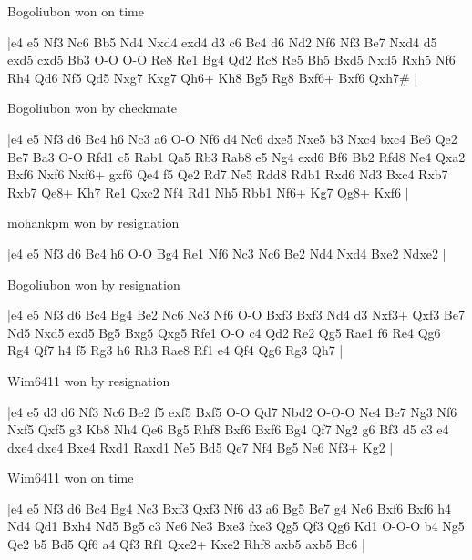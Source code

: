 \showboard

Bogoliubon won on time

\makegametitle
|e4 e5 Nf3 Nc6 Bb5 Nd4 Nxd4 exd4 d3 c6 Bc4 d6 Nd2 Nf6 Nf3 Be7 Nxd4 d5 exd5 cxd5 Bb3 O-O O-O Re8 Re1 Bg4 Qd2 Rc8 Re5 Bh5 Bxd5 Nxd5 Rxh5 Nf6 Rh4 Qd6 Nf5 Qd5 Nxg7 Kxg7 Qh6+ Kh8 Bg5 Rg8 Bxf6+ Bxf6 Qxh7\#  |

\showboard

Bogoliubon won by checkmate

\makegametitle
|e4 e5 Nf3 d6 Bc4 h6 Nc3 a6 O-O Nf6 d4 Nc6 dxe5 Nxe5 b3 Nxc4 bxc4 Be6 Qe2 Be7 Ba3 O-O Rfd1 c5 Rab1 Qa5 Rb3 Rab8 e5 Ng4 exd6 Bf6 Bb2 Rfd8 Ne4 Qxa2 Bxf6 Nxf6 Nxf6+ gxf6 Qe4 f5 Qe2 Rd7 Ne5 Rdd8 Rdb1 Rxd6 Nd3 Bxc4 Rxb7 Rxb7 Qe8+ Kh7 Re1 Qxc2 Nf4 Rd1 Nh5 Rbb1 Nf6+ Kg7 Qg8+ Kxf6  |

\showboard

mohankpm won by resignation

\makegametitle
|e4 e5 Nf3 d6 Bc4 h6 O-O Bg4 Re1 Nf6 Nc3 Nc6 Be2 Nd4 Nxd4 Bxe2 Ndxe2  |

\showboard

Bogoliubon won by resignation

\makegametitle
|e4 e5 Nf3 d6 Bc4 Bg4 Be2 Nc6 Nc3 Nf6 O-O Bxf3 Bxf3 Nd4 d3 Nxf3+ Qxf3 Be7 Nd5 Nxd5 exd5 Bg5 Bxg5 Qxg5 Rfe1 O-O c4 Qd2 Re2 Qg5 Rae1 f6 Re4 Qg6 Rg4 Qf7 h4 f5 Rg3 h6 Rh3 Rae8 Rf1 e4 Qf4 Qg6 Rg3 Qh7  |

\showboard

Wim6411 won by resignation

\makegametitle
|e4 e5 d3 d6 Nf3 Nc6 Be2 f5 exf5 Bxf5 O-O Qd7 Nbd2 O-O-O Ne4 Be7 Ng3 Nf6 Nxf5 Qxf5 g3 Kb8 Nh4 Qe6 Bg5 Rhf8 Bxf6 Bxf6 Bg4 Qf7 Ng2 g6 Bf3 d5 c3 e4 dxe4 dxe4 Bxe4 Rxd1 Raxd1 Ne5 Bd5 Qe7 Nf4 Bg5 Ne6 Nf3+ Kg2  |

\showboard

Wim6411 won on time

\makegametitle
|e4 e5 Nf3 d6 Bc4 Bg4 Nc3 Bxf3 Qxf3 Nf6 d3 a6 Bg5 Be7 g4 Nc6 Bxf6 Bxf6 h4 Nd4 Qd1 Bxh4 Nd5 Bg5 c3 Ne6 Ne3 Bxe3 fxe3 Qg5 Qf3 Qg6 Kd1 O-O-O b4 Ng5 Qe2 b5 Bd5 Qf6 a4 Qf3 Rf1 Qxe2+ Kxe2 Rhf8 axb5 axb5 Bc6  |

